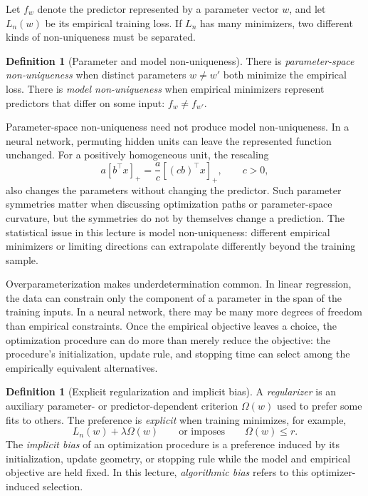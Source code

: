 \documentclass[11pt,twoside]{article}
\theoremstyle{definition}
\newtheorem{definition}[theorem]{Definition}
\theoremstyle{remark}
\begin{document}
Let $f_w$ denote the predictor represented by a parameter vector $w$, and let
$L_n(w)$ be its empirical training loss. If $L_n$ has many minimizers, two
different kinds of non-uniqueness must be separated.

\begin{definition}[Parameter and model non-uniqueness]
\label{def:two-nonuniqueness}
There is \emph{parameter-space non-uniqueness} when distinct parameters
$w\ne w'$ both minimize the empirical loss. There is \emph{model
non-uniqueness} when empirical minimizers represent predictors that differ on
some input: $f_w\ne f_{w'}$.
\end{definition}

Parameter-space non-uniqueness need not produce model non-uniqueness. In a
neural network, permuting hidden units can leave the represented function
unchanged. For a positively homogeneous unit, the rescaling
\[
 a[b^\top x]_+=\frac ac[(cb)^\top x]_+,
 \qquad c>0,
\]
also changes the parameters without changing the predictor. Such parameter
symmetries matter when discussing optimization paths or parameter-space
curvature, but the symmetries do not by themselves change a prediction. The
statistical issue in this lecture is model non-uniqueness: different empirical
minimizers or limiting directions can extrapolate differently beyond the
training sample.

Overparameterization makes underdetermination common. In linear regression,
the data can constrain only the component of a parameter in the span of the
training inputs. In a neural network, there may be many more degrees of
freedom than empirical constraints. Once the empirical objective leaves a
choice, the optimization procedure can do more than merely reduce the
objective: the procedure's initialization, update rule, and stopping time can
select among the empirically equivalent alternatives.

\begin{definition}[Explicit regularization and implicit bias]
\label{def:regularization-bias}
A \emph{regularizer} is an auxiliary parameter- or predictor-dependent
criterion $\Omega(w)$ used to prefer some fits to others. The preference is
\emph{explicit} when training minimizes, for example,
\[
 L_n(w)+\lambda\Omega(w)
 \qquad\text{or imposes}\qquad \Omega(w)\le r.
\]
The \emph{implicit bias} of an optimization procedure is a preference induced
by its initialization, update geometry, or stopping rule while the model and
empirical objective are held fixed. In this lecture, \emph{algorithmic bias}
refers to this optimizer-induced selection.
\end{definition}
\end{document}
